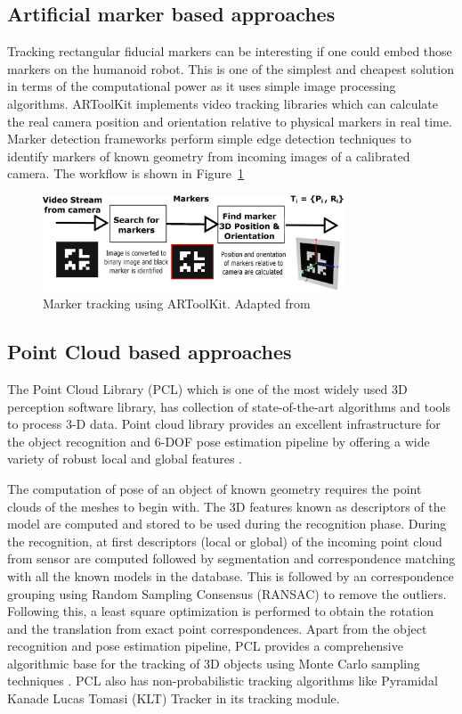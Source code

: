 \subsection{Artificial marker based approaches}
Tracking rectangular fiducial markers can be interesting if one could embed those markers on the humanoid robot. This is one of the simplest and cheapest solution in terms of the computational power as it uses simple image processing algorithms. ARToolKit \cite{kato1999marker} implements video tracking libraries which can calculate the real camera position and orientation relative to physical markers in real time. Marker detection frameworks perform simple edge detection techniques to identify markers of known geometry from incoming images of a calibrated camera. The workflow is shown in Figure~\ref{fig:artoolkit}
\begin{figure}[H]
\centering
\includegraphics[width=0.8\textwidth]{assets/artoolkit.eps}
\caption[Marker tracking using ARToolKit]{Marker tracking using ARToolKit. {Adapted from \cite{kato1999marker}}}
\label{fig:artoolkit}
\end{figure}
\subsection{Point Cloud based approaches}
\label{ssec:pcl}
The Point Cloud Library (PCL) \cite{rusu20113d} which is one of the most widely used 3D perception software library, has collection of state-of-the-art algorithms and tools to process 3-D data. Point cloud library provides an excellent infrastructure for the object recognition and 6-DOF pose estimation pipeline by offering a wide variety of robust local and global features \cite{aldoma2012point}. 

The computation of pose of an object of known geometry requires the point clouds of the meshes to begin with. The 3D features known as descriptors of the model are computed and stored to be used during the recognition phase.  During the recognition, at first descriptors (local or global) of the incoming point cloud from sensor are computed followed by segmentation and correspondence matching with all the known models in the database. This is followed by an correspondence grouping using Random Sampling Consensus (RANSAC) to remove the outliers. Following this, a least square optimization is performed to obtain the rotation and the translation from exact point correspondences. Apart from the object recognition and pose estimation pipeline, PCL provides a comprehensive algorithmic base for the tracking of 3D objects using Monte Carlo sampling techniques \cite{RUeda2012}. PCL also has non-probabilistic tracking algorithms like Pyramidal Kanade Lucas Tomasi (KLT) Tracker in its tracking module.
